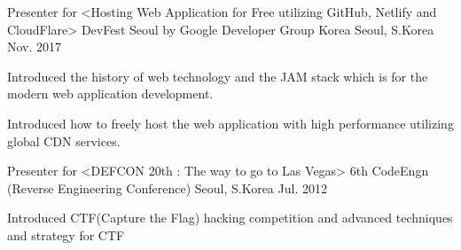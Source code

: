 

\begin{cventries}

  \cventry
    {Presenter for <Hosting Web Application for Free utilizing GitHub, Netlify and CloudFlare>} %
    {DevFest Seoul by Google Developer Group Korea} %
    {Seoul, S.Korea} %
    {Nov. 2017} %
    {
      \begin{cvitems} %
        \item {Introduced the history of web technology and the JAM stack which is for the modern web application development.}
        \item {Introduced how to freely host the web application with high performance utilizing global CDN services.}
      \end{cvitems}
    }

  \cventry
    {Presenter for <DEFCON 20th : The way to go to Las Vegas>} %
    {6th CodeEngn (Reverse Engineering Conference)} %
    {Seoul, S.Korea} %
    {Jul. 2012} %
    {
      \begin{cvitems} %
        \item {Introduced CTF(Capture the Flag) hacking competition and advanced techniques and strategy for CTF}
      \end{cvitems}
    }

\end{cventries}
